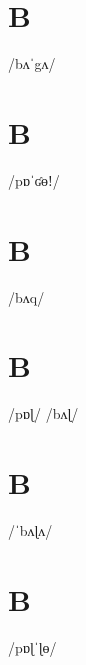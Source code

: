 \documentclass[10pt,a4paper,twoside]{book}
\begin{document}
\section*{B}

\begin{multicols}{3}
 {/bʌˈgʌ/} {}
\end{multicols}

\section*{B}

\begin{multicols}{3}
 {/pɒˈʛɵǃ/} {}
\end{multicols}

\section*{B}

\begin{multicols}{3}
 {/bʌq/} {}
\end{multicols}

\section*{B}

\begin{multicols}{3}
 {/pɒɭ/} {}
 {/bʌɭ/} {}
\end{multicols}

\section*{B}

\begin{multicols}{3}
 {/ˈbʌɭʌ/} {}
\end{multicols}

\section*{B}

\begin{multicols}{3}
 {/pɒɭˈɭɵ/} {}
\end{multicols}
\end{document}
